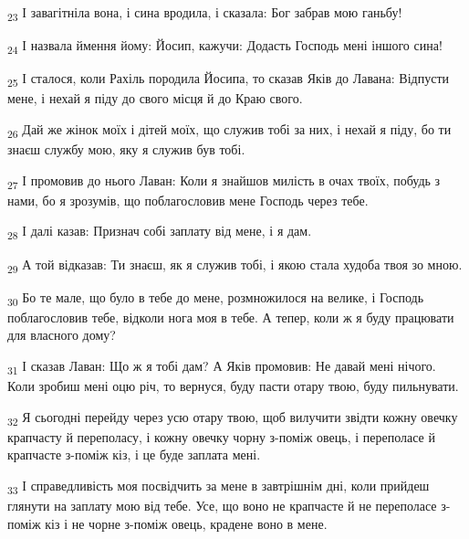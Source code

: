 \begin{tcolorbox}
\textsubscript{23} І завагітніла вона, і сина вродила, і сказала: Бог забрав мою ганьбу!
\end{tcolorbox}
\begin{tcolorbox}
\textsubscript{24} І назвала ймення йому: Йосип, кажучи: Додасть Господь мені іншого сина!
\end{tcolorbox}
\begin{tcolorbox}
\textsubscript{25} І сталося, коли Рахіль породила Йосипа, то сказав Яків до Лавана: Відпусти мене, і нехай я піду до свого місця й до Краю свого.
\end{tcolorbox}
\begin{tcolorbox}
\textsubscript{26} Дай же жінок моїх і дітей моїх, що служив тобі за них, і нехай я піду, бо ти знаєш службу мою, яку я служив був тобі.
\end{tcolorbox}
\begin{tcolorbox}
\textsubscript{27} І промовив до нього Лаван: Коли я знайшов милість в очах твоїх, побудь з нами, бо я зрозумів, що поблагословив мене Господь через тебе.
\end{tcolorbox}
\begin{tcolorbox}
\textsubscript{28} І далі казав: Признач собі заплату від мене, і я дам.
\end{tcolorbox}
\begin{tcolorbox}
\textsubscript{29} А той відказав: Ти знаєш, як я служив тобі, і якою стала худоба твоя зо мною.
\end{tcolorbox}
\begin{tcolorbox}
\textsubscript{30} Бо те мале, що було в тебе до мене, розмножилося на велике, і Господь поблагословив тебе, відколи нога моя в тебе. А тепер, коли ж я буду працювати для власного дому?
\end{tcolorbox}
\begin{tcolorbox}
\textsubscript{31} І сказав Лаван: Що ж я тобі дам? А Яків промовив: Не давай мені нічого. Коли зробиш мені оцю річ, то вернуся, буду пасти отару твою, буду пильнувати.
\end{tcolorbox}
\begin{tcolorbox}
\textsubscript{32} Я сьогодні перейду через усю отару твою, щоб вилучити звідти кожну овечку крапчасту й переполасу, і кожну овечку чорну з-поміж овець, і переполасе й крапчасте з-поміж кіз, і це буде заплата мені.
\end{tcolorbox}
\begin{tcolorbox}
\textsubscript{33} І справедливість моя посвідчить за мене в завтрішнім дні, коли прийдеш глянути на заплату мою від тебе. Усе, що воно не крапчасте й не переполасе з-поміж кіз і не чорне з-поміж овець, крадене воно в мене.
\end{tcolorbox}
